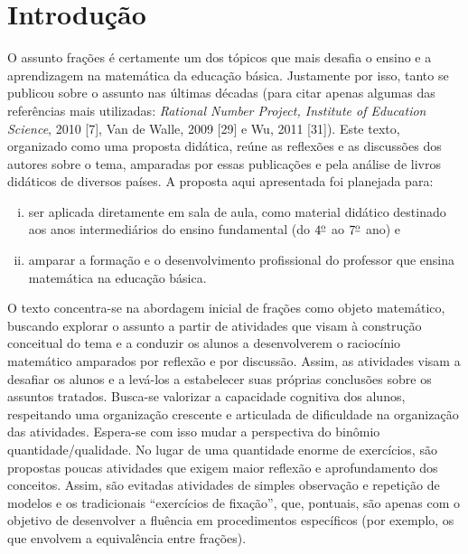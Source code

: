 
%
%
% 

\setcounter{chapter}{-1}
\chapter{Introdução}


O assunto frações é certamente um dos tópicos que mais desafia o ensino e a aprendizagem na matemática da educação básica. Justamente por isso, tanto se publicou sobre o assunto nas últimas décadas (para citar apenas algumas das referências mais utilizadas:  {\it Rational Number Project, Institute of Education Science}, 2010 [7], Van de Walle, 2009 [29] e Wu, 2011 [31]). Este texto, organizado como uma proposta didática,  reúne as reflexões e as discussões dos autores sobre o tema, amparadas por essas publicações e pela análise de livros didáticos de diversos países. A proposta aqui apresentada foi planejada para:

\begin{enumerate}[(i)]
\item  ser aplicada diretamente em sala de aula, como material didático destinado aos anos intermediários do ensino fundamental (do $4^{\textrm{\underline{o}}}$ ao $7^{\textrm{\underline{o}}}$ ano) e
\item amparar a formação e o desenvolvimento profissional do professor que ensina matemática na educação básica.
\end{enumerate}

O texto concentra-se na abordagem inicial de frações como objeto matemático, buscando explorar o assunto a partir de atividades que visam à construção conceitual do tema e a conduzir os alunos a desenvolverem o raciocínio matemático amparados por reflexão e por discussão. Assim, as atividades visam a desafiar os alunos e a levá-los a estabelecer suas próprias conclusões sobre os assuntos tratados. Busca-se valorizar a capacidade cognitiva dos alunos, respeitando uma organização crescente e articulada de diﬁculdade na organização das atividades. Espera-se com isso mudar a perspectiva do binômio quantidade/qualidade. No lugar de uma quantidade enorme de exercícios, são propostas poucas  atividades que exigem maior reflexão e aprofundamento dos conceitos. Assim, são evitadas atividades de simples observação e repetição de modelos e os tradicionais ``exercícios de fixação'', que, pontuais, são apenas com o objetivo de desenvolver a fluência em procedimentos específicos (por exemplo, os que envolvem a equivalência entre frações).

